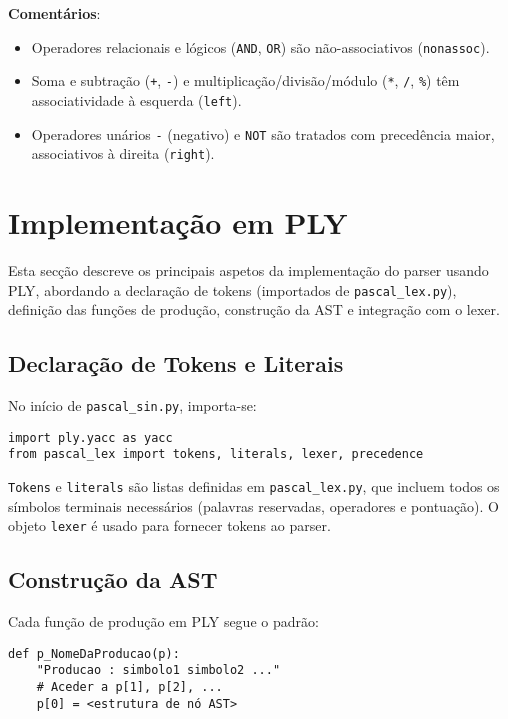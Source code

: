 \noindent

\textbf{Comentários}:
\begin{itemize}
    \item Operadores relacionais e lógicos (\texttt{AND}, \texttt{OR}) são não-associativos (\texttt{nonassoc}).
    \item Soma e subtração (\texttt{+}, \texttt{-}) e multiplicação/divisão/módulo (\texttt{*}, \texttt{/}, \texttt{\%}) têm associatividade à esquerda (\texttt{left}).
    \item Operadores unários \texttt{-} (negativo) e \texttt{NOT} são tratados com precedência maior, associativos à direita (\texttt{right}).
\end{itemize}

\section{Implementação em PLY}
\label{sec:implementacao}

Esta secção descreve os principais aspetos da implementação do parser usando PLY, abordando a declaração de tokens (importados de \texttt{pascal\_lex.py}), definição das funções de produção, construção da AST e integração com o lexer.

\subsection{Declaração de Tokens e Literais}
No início de \texttt{pascal\_sin.py}, importa-se:

\begin{verbatim}
import ply.yacc as yacc
from pascal_lex import tokens, literals, lexer, precedence
\end{verbatim}

\noindent

\texttt{Tokens} e \texttt{literals} são listas definidas em \texttt{pascal\_lex.py}, que incluem todos os símbolos terminais necessários (palavras reservadas, operadores e pontuação). O objeto \texttt{lexer} é usado para fornecer tokens ao parser.

\subsection{Construção da AST}

Cada função de produção em PLY segue o padrão:

\begin{verbatim}
def p_NomeDaProducao(p):
    "Producao : simbolo1 simbolo2 ..."
    # Aceder a p[1], p[2], ...
    p[0] = <estrutura de nó AST>
\end{verbatim}

